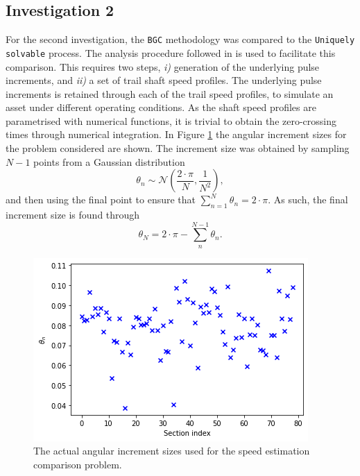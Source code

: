 \documentclass{article}
\begin{document}
	\subsection{Investigation 2}
	
	For the second investigation, the \texttt{BGC} methodology was compared to the \texttt{Uniquely solvable} process. The analysis procedure followed in \cite{Diamond2016} is used to facilitate this comparison. This requires two steps, \emph{i)} generation of the underlying pulse increments, and \emph{ii)} a set of trail shaft speed profiles. The underlying pulse increments is retained through each of the trail speed profiles, to simulate an asset under different operating conditions. As the shaft speed profiles are parametrised with numerical functions, it is trivial to obtain the zero-crossing times through numerical integration. In Figure \ref{fig:Q4_increments} the angular increment sizes for the problem considered are shown. The increment size was obtained by sampling $N-1$ points from a Gaussian distribution 
	\begin{equation}
		\theta_n \sim \mathcal{N}(\frac{2\cdot\pi}{N}, \frac{1}{N^2}),
	\end{equation} 
	and then using the final point to ensure that $\sum_{n=1}^{N}\theta_n = 2\cdot \pi$. As such, the final increment size is found through 
	\begin{equation}
		\theta_N = 2\cdot \pi - \sum_{n}^{N-1}\theta_n.
	\end{equation}
	\begin{figure}[htb!]
		\centering
		\includegraphics[scale=0.6]{Q4_2.png}
		\caption{The actual angular increment sizes used for the speed estimation comparison problem.}
		\label{fig:Q4_increments}
	\end{figure}
\end{document}
